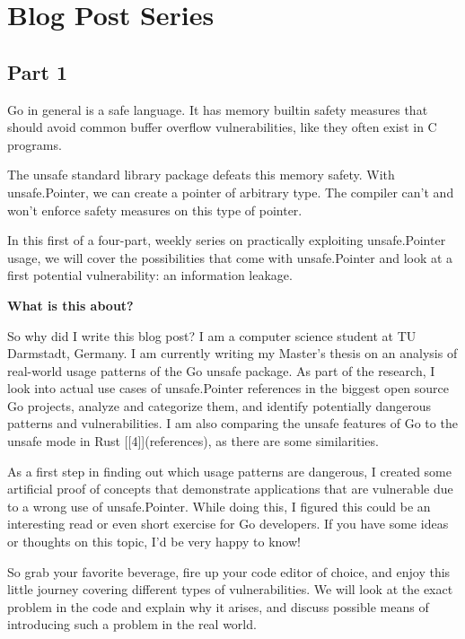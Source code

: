 
\chapter{Blog Post Series}\label{ch:blog}



\section{Part 1}

Go in general is a safe language. It has memory builtin safety measures that should avoid common buffer overflow 
vulnerabilities, like they often exist in C programs.

The unsafe standard library package defeats this memory safety. With unsafe.Pointer, we can create a pointer of 
arbitrary type. The compiler can't and won't enforce safety measures on this type of pointer.

In this first of a four-part, weekly series on practically exploiting unsafe.Pointer usage, we will cover the possibilities
that come with unsafe.Pointer and look at a first potential vulnerability: an information leakage.


\textbf{What is this about?}

So why did I write this blog post? I am a computer science student at TU Darmstadt, Germany. I am currently writing my
Master's thesis on an analysis of real-world usage patterns of the Go unsafe package. As part of the research, I look
into actual use cases of unsafe.Pointer references in the biggest open source Go projects, analyze and categorize them,
and identify potentially dangerous patterns and vulnerabilities. I am also comparing the unsafe features of Go to the
unsafe mode in Rust [[4]](references), as there are some similarities.

As a first step in finding out which usage patterns are dangerous, I created some artificial proof of concepts that
demonstrate applications that are vulnerable due to a wrong use of unsafe.Pointer. While doing this, I figured this
could be an interesting read or even short exercise for Go developers. If you have some ideas or thoughts on this topic,
I'd be very happy to know!

So grab your favorite beverage, fire up your code editor of choice, and enjoy this little journey covering different
types of vulnerabilities. We will look at the exact problem in the code and explain why it arises, and discuss possible
means of introducing such a problem in the real world.


